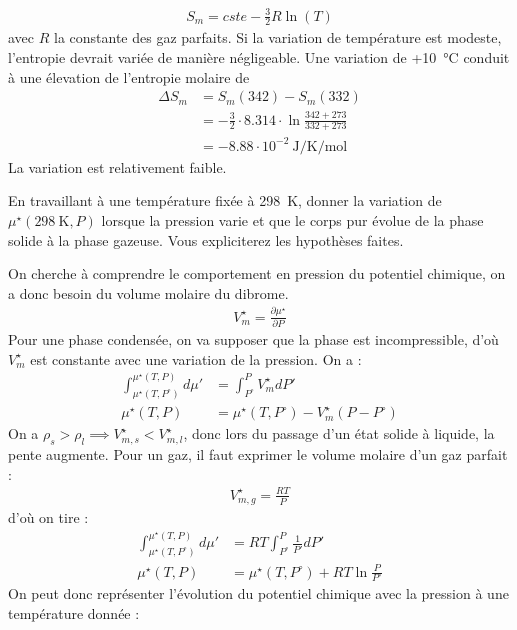 \begin{exercise}
\begin{questions}
\begin{solution}
\begin{align*}
S_m = cste - \frac{3}{2} R \ln ( T )
\end{align*}
avec $R$ la constante des gaz parfaits.
Si la variation de température est modeste, l'entropie devrait variée de manière négligeable. Une variation de +\SI{10}{\celsius} conduit à une élevation de l'entropie molaire de 
\begin{align*}
\Delta S_m  &= S_m (342) - S_m(332) \\ 
&= -\frac{3}{2} \cdot 8.314 \cdot \ln \frac{342 + 273}{332 + 273} \\
&= -8.88 \cdot 10^{-2} ~ \si{\joule\per\kelvin\per\mole}
\end{align*}
La variation est relativement faible.
\end{solution}

\question En travaillant à une température fixée à \SI{298}{\kelvin}, donner la variation de $\mu^\star (\SI{298}{\kelvin}, P)$ lorsque la pression varie et que le corps pur évolue de la phase solide à la phase gazeuse. Vous expliciterez les hypothèses faites.
\begin{solution}
On cherche à comprendre le comportement en pression du potentiel chimique, on a donc besoin du volume molaire du dibrome.
\begin{align*}
V^\star_m = \frac{\partial \mu^\star}{\partial P}
\end{align*}
Pour une phase condensée, on va supposer que la phase est incompressible, d'où $V^\star_m$ est constante avec une variation de la pression. On a : 
\begin{align*}
\int_{\mu^\star(T, P^\circ)}^{\mu^\star (T, P)} d\mu ' &= \int_{P^\circ}^P V^\star_m dP' \\
\mu^\star (T, P) &= \mu^\star(T, P^\circ) - V^\star_m (P-P^\circ)
\end{align*}
On a $\rho_s > \rho_l \implies V^\star_{m,s} < V^\star_{m,l}$, donc lors du passage d'un état solide à liquide, la pente augmente.
Pour un gaz, il faut exprimer le volume molaire d'un gaz parfait : 
\begin{align*}
V^\star_{m,g} = \frac{RT}{P}
\end{align*}
d'où on tire : 
\begin{align*}
\int_{\mu^\star(T, P^\circ)}^{\mu^\star (T, P)} d\mu ' &= RT \int_{P^\circ}^P \frac{1}{P'} dP' \\
\mu^\star (T, P) &= \mu^\star (T, P^\circ) + RT \ln \frac{P}{P^\circ}
\end{align*}
On peut donc représenter l'évolution du potentiel chimique avec la pression à une température donnée : 

\end{solution}
\end{questions}
\end{exercise}
